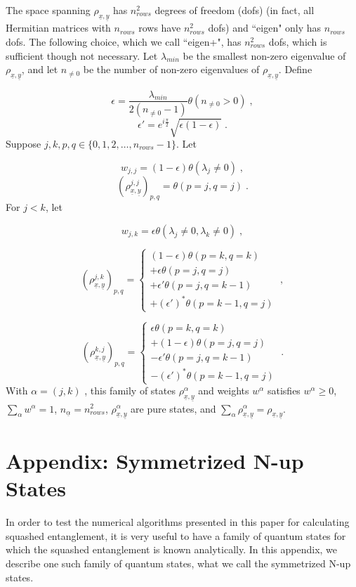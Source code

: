 \documentclass[12pt]{article}%
\newcommand{\beq}{\begin{equation}}
\newcommand{\eeq}{\end{equation}}
\newcommand{\ul}[1]{\underline{#1}}
\newcommand{\rvx}[0]{{\ul{x}}}
\newcommand{\rvy}[0]{{\ul{y}}}
\newcommand{\lam}[0]{\lambda}
\newcommand{\rvalp}[0]{{\ul{\alpha}}}
\newcommand{\alp}[0]{{\alpha}}
\begin{document}
{The space spanning
$\rho_{\rvx, \rvy}$ has $n_{rows}^2$ degrees of freedom (dofs)
(in fact,
all Hermitian matrices with $n_{rows}$ rows have $n_{rows}^2$ dofs)
 and ``eigen" only has
$n_{rows}$ dofs. The following choice,
which we call ``eigen+", has $n_{rows}^2$ dofs,
which is sufficient though not necessary.
Let $\lam_{min}$ be the smallest non-zero
eigenvalue of $\rho_{\rvx, \rvy}$, and let
$n_{\neq 0}$ be the number of non-zero eigenvalues of
$\rho_{\rvx, \rvy}$. Define

\beq
\epsilon = \frac{\lam_{min}}{2(n_{\neq 0}-1)}\theta(n_{\ne0}> 0)
\;,
\eeq
\beq
\epsilon'= e^{i\frac{\pi}{2}}\sqrt{\epsilon(1-\epsilon)}
\;.
\eeq
Suppose $j, k, p, q\in \{0, 1, 2, \ldots, n_{rows}-1\}$. Let

\beq
w_{j,j}=
(1-\epsilon)\theta(\lam_j\neq 0)
\;,
\eeq
\beq
(\rho_{\rvx, \rvy}^{j,j})_{p, q}=\theta(p=j, q=j)
\;.
\eeq
For $j<k$, let

\beq
w_{j,k}=
\epsilon \theta(\lam_j\neq 0, \lam_k \neq 0)
\;,
\eeq

\beq
(\rho_{\rvx, \rvy}^{j,k})_{p,q}=
\left\{
\begin{array}{l}
(1-\epsilon)\theta(p=k, q=k)\\
+\epsilon\theta(p=j, q=j)\\
+\epsilon'\theta(p=j, q=k-1)\\
+(\epsilon')^* \theta(p=k-1, q=j)
\end{array}
\right.
\;,
\eeq

\beq
(\rho_{\rvx, \rvy}^{k, j})_{p,q}=
\left\{
\begin{array}{l}
\epsilon\theta(p=k, q=k)\\
+(1-\epsilon)\theta(p=j, q=j)\\
-\epsilon'\theta(p=j, q=k-1)\\
-(\epsilon')^* \theta(p=k-1, q=j)
\end{array}
\right.
\;.
\eeq
With $\alp=(j,k)$ , this family of states $\rho_{\rvx, \rvy}^\alp$
and weights $w^\alp$ satisfies $w^\alp\geq0$,
 $\sum_\alp w^\alp=1$, $n_\rvalp=n_{rows}^2$,
  $\rho_{\rvx, \rvy}^\alp$ are pure states,
and $\sum_\alp \rho_{\rvx, \rvy}^\alp =
\rho_{\rvx, \rvy}$.

\section{Appendix: Symmetrized N-up States}

In order to test the numerical algorithms
presented in this paper for calculating
squashed entanglement, it is very useful
to have a family of quantum states for which
the squashed entanglement is known
analytically. In this appendix, we describe
one such family of quantum states,
what we call the symmetrized N-up states.


}
\end{document}
